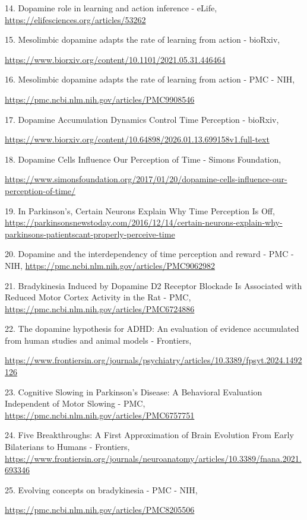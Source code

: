 14. Dopamine role in learning and action inference - eLife, \url{https://elifesciences.org/articles/53262}

15. Mesolimbic dopamine adapts the rate of learning from action - bioRxiv,

\url{https://www.biorxiv.org/content/10.1101/2021.05.31.446464}

16. Mesolimbic dopamine adapts the rate of learning from action - PMC - NIH,

\url{https://pmc.ncbi.nlm.nih.gov/articles/PMC9908546}

17. Dopamine Accumulation Dynamics Control Time Perception - bioRxiv,

\url{https://www.biorxiv.org/content/10.64898/2026.01.13.699158v1.full-text}

18. Dopamine Cells Influence Our Perception of Time - Simons Foundation,

\url{https://www.simonsfoundation.org/2017/01/20/dopamine-cells-influence-our-perception-of-time/}

19. In Parkinson's, Certain Neurons Explain Why Time Perception Is Off,\\
\url{https://parkinsonsnewstoday.com/2016/12/14/certain-neurons-explain-why-parkinsons-patientscant-properly-perceive-time}

20. Dopamine and the interdependency of time perception and reward - PMC - NIH, \url{https://pmc.ncbi.nlm.nih.gov/articles/PMC9062982}

21. Bradykinesia Induced by Dopamine D2 Receptor Blockade Is Associated with Reduced Motor Cortex Activity in the Rat - PMC, \url{https://pmc.ncbi.nlm.nih.gov/articles/PMC6724886}

22. The dopamine hypothesis for ADHD: An evaluation of evidence accumulated from human studies and animal models - Frontiers,

\url{https://www.frontiersin.org/journals/psychiatry/articles/10.3389/fpsyt.2024.1492126}

23. Cognitive Slowing in Parkinson's Disease: A Behavioral Evaluation Independent of Motor Slowing - PMC, \url{https://pmc.ncbi.nlm.nih.gov/articles/PMC6757751}

24. Five Breakthroughs: A First Approximation of Brain Evolution From Early Bilaterians to Humans - Frontiers, \url{https://www.frontiersin.org/journals/neuroanatomy/articles/10.3389/fnana.2021.693346}

25. Evolving concepts on bradykinesia - PMC - NIH,

\url{https://pmc.ncbi.nlm.nih.gov/articles/PMC8205506}

